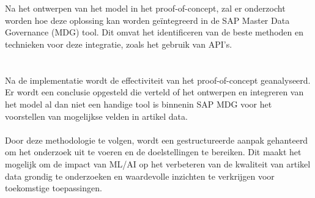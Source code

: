 \section{}%
\label{sec:IntegratieM}
Na het ontwerpen van het model in het proof-of-concept, zal er onderzocht worden hoe deze oplossing kan worden geïntegreerd in de SAP Master Data Governance (MDG) tool. Dit omvat het identificeren van de beste methoden en technieken voor deze integratie, zoals het gebruik van API's.

\section{}%
\label{sec:ConclusieM}
Na de implementatie wordt de effectiviteit van het proof-of-concept geanalyseerd. Er wordt een conclusie opgesteld die verteld of het ontwerpen en integreren van het model al dan niet een handige tool is binnenin SAP MDG voor het voorstellen van mogelijkse velden in artikel data. 
\\ \\
Door deze methodologie te volgen, wordt een gestructureerde aanpak gehanteerd om het onderzoek uit te voeren en de doelstellingen te bereiken. Dit maakt het mogelijk om de impact van ML/AI op het verbeteren van de kwaliteit van artikel data grondig te onderzoeken en waardevolle inzichten te verkrijgen voor toekomstige toepassingen.